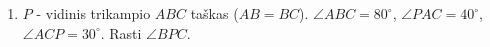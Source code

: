 \begin{enumerate}
\item $P$ - vidinis trikampio $ABC$ taškas ($AB = BC$).
  $\angle ABC = 80^\circ$, $\angle PAC = 40^\circ$, $\angle
  ACP = 30^\circ$. Rasti $\angle BPC$. 

\end{enumerate}
